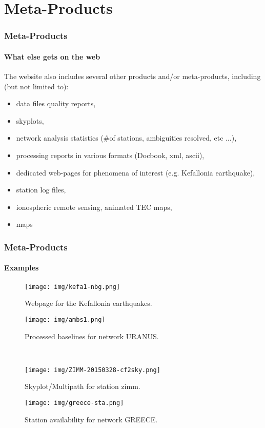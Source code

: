 \documentclass{beamer}
\newcommand\FourQuad[4]{
    \begin{minipage}[b][.45\textheight][t]{.50\textwidth}\centering#1\end{minipage}\hfill%
    \begin{minipage}[b][.45\textheight][t]{.50\textwidth}\centering#2\end{minipage}\\[0.9em]
    \begin{minipage}[b][.45\textheight][t]{.50\textwidth}\centering#3\end{minipage}\hfill
    \begin{minipage}[b][.45\textheight][t]{.50\textwidth}\centering#4\end{minipage}%
}
\begin{document}
\section{Meta-Products}

\begin{frame}\frametitle{Meta-Products}\framesubtitle{What else gets on the web}

    The website also includes several other products and/or meta-products, including
    (but not limited to):

  \begin{itemize}
    \item data files quality reports,
    \item skyplots,
    \item network analysis statistics (\#of stations, ambiguities resolved, etc $\dots$),
    \item processing reports in various formats (Docbook, xml, ascii),
    \item dedicated web-pages for phenomena of interest (e.g. Kefallonia earthquake),
    \item station log files,
    \item ionospheric remote sensing, animated TEC maps,
    \item maps
  \end{itemize}

\end{frame}

\begin{frame}\frametitle{Meta-Products}\framesubtitle{Examples}

    \FourQuad
    {
        \begin{figure}[t]
            \texttt{[image: img/kefa1-nbg.png]}
            \caption{Webpage for the Kefallonia earthquakes.}
        \end{figure}
    }
    {
        \begin{figure}[t]
            \texttt{[image: img/ambs1.png]}
            \caption{Processed baselines for network URANUS.}
        \end{figure}
    }
    {
        \begin{figure}[b]
            \texttt{[image: img/ZIMM-20150328-cf2sky.png]}
            \caption{Skyplot/Multipath for station zimm.}
        \end{figure}
    }
    {
        \begin{figure}[b]
            \texttt{[image: img/greece-sta.png]}
            \caption{Station availability for network GREECE.}
        \end{figure}
    }

\end{frame}
\end{document}
